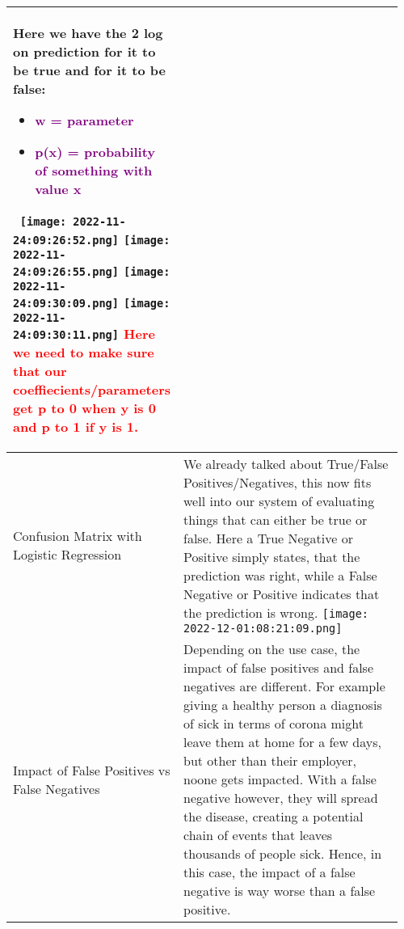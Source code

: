 \documentclass[main.tex,fontsize=8pt,paper=a4,paper=portrait,DIV=calc,]{scrartcl}
\begin{document}
\begin{table}[ht!]
\begin{tabular}{|m{0.2\linewidth}|m{0.755\linewidth}|}
Here we have the 2 log on prediction for it to be true and for it to be false:\newline 
\begin{itemize}
\item \textcolor{purple}{w = parameter}
\item \textcolor{purple}{p(x) = probability of something with value x}
\vspace{-3mm}
\end{itemize}
\, \newline
\texttt{[image: 2022-11-24:09:26:52.png]} \texttt{[image: 2022-11-24:09:26:55.png]}\newline
\texttt{[image: 2022-11-24:09:30:09.png]} \texttt{[image: 2022-11-24:09:30:11.png]}\newline
\textcolor{red}{Here we need to make sure that our coeffiecients/parameters get p to 0 when y is 0 and p to 1 if y is 1.}\newline
\\
\hline
Confusion Matrix with Logistic Regression & 
We already talked about True/False Positives/Negatives, this now fits well into our system of evaluating things that can either be true or false.\newline
Here a True Negative or Positive simply states, that the prediction was right, while a False Negative or Positive indicates that the prediction is wrong.\newline
\texttt{[image: 2022-12-01:08:21:09.png]}\\
\hline
Impact of False Positives vs False Negatives & 
Depending on the use case, the impact of false positives and false negatives are different. For example giving a healthy person a diagnosis of sick in terms of corona might leave them at home for a few days, but other than their employer, noone gets impacted. With a false negative however, they will spread the disease, creating a potential chain of events that leaves thousands of people sick. Hence, in this case, the impact of a false negative is way worse than a false positive.\\
\hline
\end{tabular}
\end{table}
\pagebreak 
\end{document}
